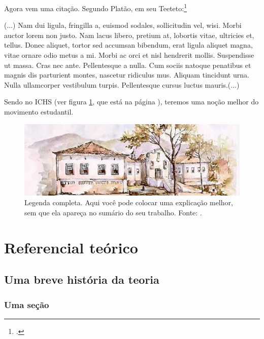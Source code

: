 \documentclass[
	12pt,				%
	openright,			%
	twoside,			%
	a4paper,			%
	english,			%
	brazil				%
	]{abntex2}
\begin{document}
Agora vem uma citação. Segundo Platão, em seu Teeteto:\footcite{platao-teeteto}
\begin{citacao}
	(...) Nam dui ligula, fringilla a, euismod sodales, sollicitudin vel, wisi. Morbi auctor lorem non justo. Nam lacus libero, pretium at, lobortis vitae, ultricies et, tellus. Donec aliquet, tortor sed accumsan bibendum, erat ligula aliquet magna, vitae ornare odio metus a mi. Morbi ac orci et nisl hendrerit mollis. Suspendisse ut massa. Cras nec ante. Pellentesque a nulla. Cum sociis natoque penatibus et magnis dis parturient montes, nascetur ridiculus mus. Aliquam tincidunt urna. Nulla
	ullamcorper vestibulum turpis. Pellentesque cursus luctus mauris.(...)
\end{citacao}

Sendo no ICHS (ver figura \ref{fig:309}, que está na página \pageref{fig:309}), teremos uma noção melhor do movimento estudantil.

\lipsum[30]

\begin{figure}[!htbp]
	\centering
	\includegraphics[scale=0.4]{ichs2.jpg} %
	\caption[Legenda reduzida - aparece no sumário]{Legenda completa. Aqui você pode colocar uma explicação melhor, sem que ela apareça no sumário do seu trabalho. Fonte: \cite[p.~117]{boyle1772}.}
	\label{fig:309}
\end{figure}
\part{Referencial teórico}
\chapter{Uma breve história da teoria}

\section{Uma seção}
\end{document}
